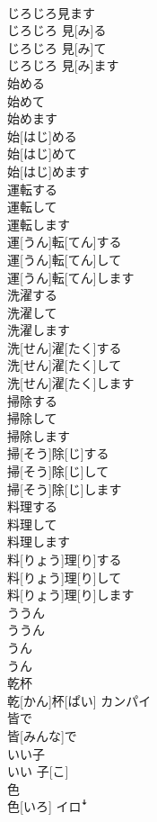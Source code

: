 \documentclass[8pt]{extreport}
\begin{document}
\begin{CJK}{UTF8}{min}
\\	じろじろ見ます	
\\	じろじろ 見[み]る 
\\	じろじろ 見[み]て 
\\	じろじろ 見[み]ます	
\\	始める 
\\	始めて 
\\	始めます	
\\	始[はじ]める 
\\	始[はじ]めて 
\\	始[はじ]めます	
\\	運転する 
\\	運転して 
\\	運転します	
\\	運[うん]転[てん]する 
\\	運[うん]転[てん]して 
\\	運[うん]転[てん]します	
\\	洗濯する 
\\	洗濯して 
\\	洗濯します	
\\	洗[せん]濯[たく]する 
\\	洗[せん]濯[たく]して 
\\	洗[せん]濯[たく]します	
\\	掃除する 
\\	掃除して 
\\	掃除します	
\\	掃[そう]除[じ]する 
\\	掃[そう]除[じ]して 
\\	掃[そう]除[じ]します	
\\	料理する 
\\	料理して 
\\	料理します	
\\	料[りょう]理[り]する 
\\	料[りょう]理[り]して 
\\	料[りょう]理[り]します	
\\	ううん	
\\	ううん	
\\	うん	
\\	うん	
\\	乾杯	
\\	乾[かん]杯[ぱい]	カンパイ
\\	皆で	
\\	皆[みんな]で	
\\	いい子	
\\	いい 子[こ]	
\\	色	
\\	色[いろ]	イロꜜ

\end{CJK}
\end{document}
